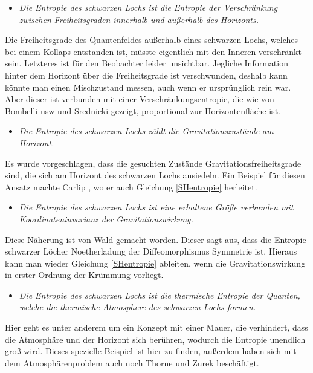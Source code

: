 \documentclass[ngerman]{scrartcl}
\begin{document}
	\begin{itemize}
		\item [~] \textit{Die Entropie des schwarzen Lochs ist die Entropie der Verschränkung zwischen Freiheitsgraden innerhalb und außerhalb des Horizonts.}
	\end{itemize}
	Die Freiheitsgrade des Quantenfeldes außerhalb eines schwarzen Lochs, welches bei einem Kollaps entstanden ist, müsste eigentlich mit den Inneren verschränkt sein. Letzteres ist für den Beobachter leider unsichtbar. Jegliche Information hinter dem Horizont über die Freiheitsgrade ist verschwunden, deshalb kann könnte man einen Mischzustand messen, auch wenn er ursprünglich rein war. Aber dieser ist verbunden mit einer Verschränkungsentropie, die wie von Bombelli usw \cite{BombelliKouLeeSorkin} und Srednicki \cite{Srednicki} gezeigt, proportional zur Horizontenfläche ist.
	
	\begin{itemize}
		\item [~] \textit{Die Entropie des schwarzen Lochs zählt die Gravitationszustände am Horizont.}
	\end{itemize}
	Es wurde vorgeschlagen, dass die gesuchten Zustände Gravitationsfreiheitsgrade sind, die sich am Horizont des schwarzen Lochs ansiedeln. Ein Beispiel für diesen Ansatz machte Carlip \cite{Carlip}, wo er auch Gleichung \eqref{SHentropie} herleitet.
	
	\begin{itemize} 
		\item [~] \textit{Die Entropie des schwarzen Lochs ist eine erhaltene Größe verbunden mit Koordinateninvarianz der Gravitationswirkung.}
	\end{itemize}
	Diese Näherung ist von Wald \cite{Wald} gemacht worden. Dieser sagt aus, dass die Entropie schwarzer Löcher Noetherladung der Diffeomorphismus Symmetrie ist.  Hieraus kann man wieder Gleichung \eqref{SHentropie} ableiten, wenn die Gravitationswirkung in erster Ordnung der Krümmung vorliegt. 
	
	\begin{itemize}
		\item [~] \textit{Die Entropie des schwarzen Lochs ist die thermische Entropie der Quanten, welche die thermische Atmosphere des schwarzen Lochs formen.}
	\end{itemize}
	Hier geht es unter anderem um ein Konzept mit einer Mauer, die verhindert, dass die Atmosphäre und der Horizont sich berühren, wodurch die Entropie unendlich groß wird.  Dieses spezielle Beispiel ist hier \cite{Hooft} zu finden, außerdem haben sich mit dem Atmosphärenproblem auch noch Thorne und Zurek \cite{ThorneZurek} beschäftigt.
	
\end{document}
